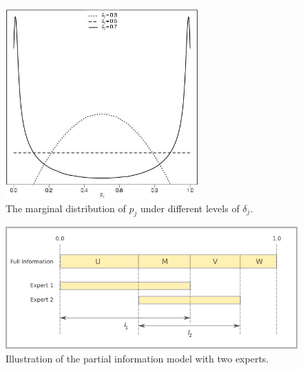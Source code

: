 \documentclass[11pt,twoside]{article}
\begin{document}
\begin{figure}[htbp]
   \centering
   \includegraphics[width = 20em]{Marginals} %
   \caption{The marginal distribution of $p_j$ under different levels of $\delta_j$.}
   \label{marginals}
\end{figure}

\begin{figure}[htbp]
   \includegraphics[width = \textwidth]{N=2} %
   \caption{Illustration of the partial information model with two experts.}
   \label{diagram2}
\end{figure}
\end{document}
